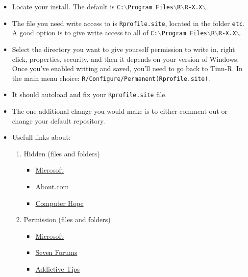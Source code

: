 \begin{itemize}
  \item Locate your \RR{} install. The default is \texttt{C:$\backslash$Program Files$\backslash$R$\backslash$R-X.X$\backslash$}.
  \item The file you need write access to is \texttt{Rprofile.site}, located in the folder \texttt{etc}.
    A good option is to give write access to all of \texttt{C:$\backslash$Program Files$\backslash$R$\backslash$R-X.X$\backslash$}.
  \item Select the directory you want to give yourself permission to write in, right click, properties,
    security, and then it depends on your version of Windows. Once you've enabled writing and saved, you'll need to go back to Tinn-R.
    In the main menu choice: \texttt{R/Configure/Permanent(Rprofile.site)}.
  \item It should autoload and fix your \texttt{Rprofile.site} file.
  \item The one additional change you would make is to either comment out or change your default repository.
  \item Usefull links about:
    \begin{enumerate}
      \item Hidden (files and folders)
        \begin{itemize}
          \item \href{http://windows.microsoft.com/en-US/windows7/Show-hidden-files}{Microsoft}
          \item \href{http://pcsupport.about.com/od/windows7/ht/show-hidden-files-windows-7.htm}{About.com}
          \item \href{http://www.computerhope.com/issues/ch000516.htm}{Computer Hope}
        \end{itemize}
      \item Permission (files and folders)
        \begin{itemize}
          \item \href{http://windows.microsoft.com/en-US/windows-vista/Troubleshoot-access-denied-when-opening-files-or-folders}{Microsoft}
          \item \href{http://www.sevenforums.com/tutorials/122666-permissions-allow-deny-users-groups.html}{Seven Forums}
          \item \href{http://www.addictivetips.com/windows-tips/windows-7-access-denied-permission-ownership/}{Addictive Tips}
        \end{itemize}
    \end{enumerate}
\end{itemize}


